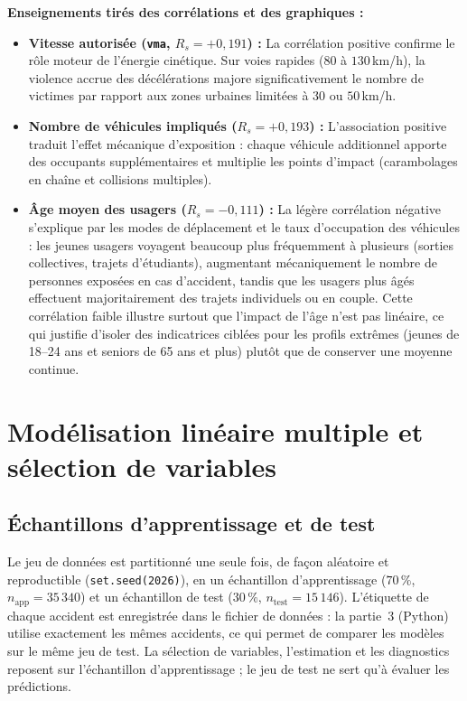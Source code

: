 \documentclass[11pt,a4paper]{article}
\begin{document}
\noindent\textbf{Enseignements tirés des corrélations et des graphiques :}
\begin{itemize}
    \item \textbf{Vitesse autorisée (\texttt{vma}, $R_s = +0{,}191$) :} La corrélation positive confirme le rôle moteur de l'énergie cinétique. Sur voies rapides ($80$ à $130$\,km/h), la violence accrue des décélérations majore significativement le nombre de victimes par rapport aux zones urbaines limitées à $30$ ou $50$\,km/h.
    \item \textbf{Nombre de véhicules impliqués ($R_s = +0{,}193$) :} L'association positive traduit l'effet mécanique d'exposition : chaque véhicule additionnel apporte des occupants supplémentaires et multiplie les points d'impact (carambolages en chaîne et collisions multiples).
    \item \textbf{Âge moyen des usagers ($R_s = -0{,}111$) :} La légère corrélation négative s'explique par les modes de déplacement et le taux d'occupation des véhicules : les jeunes usagers voyagent beaucoup plus fréquemment à plusieurs (sorties collectives, trajets d'étudiants), augmentant mécaniquement le nombre de personnes exposées en cas d'accident, tandis que les usagers plus âgés effectuent majoritairement des trajets individuels ou en couple. Cette corrélation faible illustre surtout que l'impact de l'âge n'est pas linéaire, ce qui justifie d'isoler des indicatrices ciblées pour les profils extrêmes (jeunes de 18--24 ans et seniors de 65 ans et plus) plutôt que de conserver une moyenne continue.
\end{itemize}


\section{Modélisation linéaire multiple et sélection de variables}

\subsection{Échantillons d'apprentissage et de test}
Le jeu de données est partitionné une seule fois, de façon aléatoire et reproductible (\texttt{set.seed(2026)}), en un échantillon d'apprentissage ($70\,\%$, $n_{\text{app}} = 35\,340$) et un échantillon de test ($30\,\%$, $n_{\text{test}} = 15\,146$). L'étiquette de chaque accident est enregistrée dans le fichier de données : la partie~3 (Python) utilise exactement les mêmes accidents, ce qui permet de comparer les modèles sur le même jeu de test. La sélection de variables, l'estimation et les diagnostics reposent sur l'échantillon d'apprentissage ; le jeu de test ne sert qu'à évaluer les prédictions.
\end{document}
